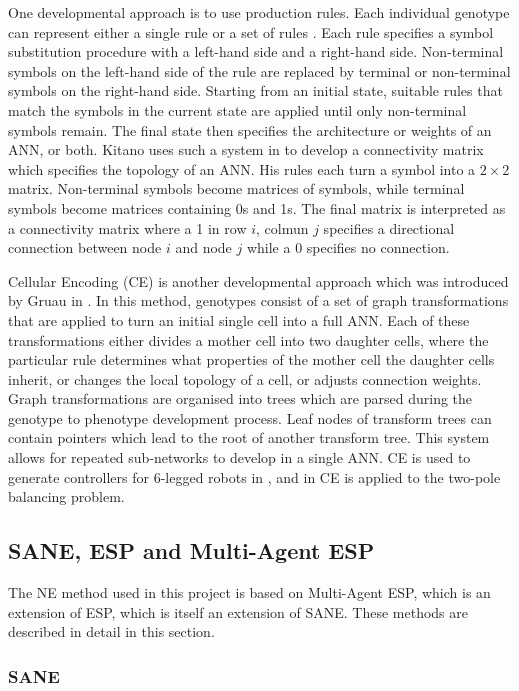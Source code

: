\documentclass[12pt]{article} %
\begin{document}
One developmental approach is to use production rules. Each individual genotype can represent either a single rule or a set of rules \cite{Yao1999}. Each rule specifies a symbol substitution procedure with a left-hand side and a right-hand side. Non-terminal symbols on the left-hand side of the rule are replaced by terminal or non-terminal symbols on the right-hand side. Starting from an initial state, suitable rules that match the symbols in the current state are applied until only non-terminal symbols remain. The final state then specifies the architecture or weights of an ANN, or both. Kitano uses such a system in \cite{Kitano1990} to develop a connectivity matrix which specifies the topology of an ANN. His rules each turn a symbol into a $2\times{}2$ matrix. Non-terminal symbols become matrices of symbols, while terminal symbols become matrices containing 0s and 1s. The final matrix is interpreted as a connectivity matrix where a 1 in row $i$, colmun $j$ specifies a directional connection between node $i$ and node $j$ while a 0 specifies no connection.

Cellular Encoding (CE) is another developmental approach which was introduced by Gruau in \cite{Gruau1992}. In this method, genotypes consist of a set of graph transformations that are applied to turn an initial single cell into a full ANN. Each of these transformations either divides a mother cell into two daughter cells, where the particular rule determines what properties of the mother cell the daughter cells inherit, or changes the local topology of a cell, or adjusts connection weights. Graph transformations are organised into trees which are parsed during the genotype to phenotype development process. Leaf nodes of transform trees can contain pointers which lead to the root of another transform tree. This system allows for repeated sub-networks to develop in a single ANN. CE is used to generate controllers for 6-legged robots in \cite{Gruau1994}, and in \cite{Gruau1996} CE is applied to the two-pole balancing problem.

\subsection{SANE, ESP and Multi-Agent ESP}

The NE method used in this project is based on Multi-Agent ESP, which is an extension of ESP, which is itself an extension of SANE. These methods are described in detail in this section.

\subsubsection{SANE}
\end{document}
